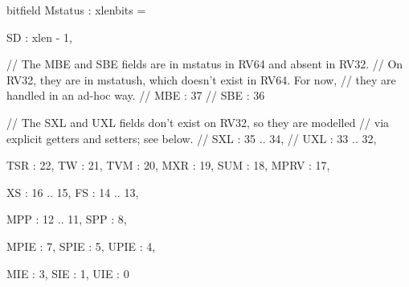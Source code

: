 bitfield Mstatus : xlenbits = {
  SD   : xlen - 1,

  // The MBE and SBE fields are in mstatus in RV64 and absent in RV32.
  // On RV32, they are in mstatush, which doesn't exist in RV64.  For now,
  // they are handled in an ad-hoc way.
  // MBE  : 37
  // SBE  : 36

  // The SXL and UXL fields don't exist on RV32, so they are modelled
  // via explicit getters and setters; see below.
  // SXL  : 35 .. 34,
  // UXL  : 33 .. 32,

  TSR  : 22,
  TW   : 21,
  TVM  : 20,
  MXR  : 19,
  SUM  : 18,
  MPRV : 17,

  XS   : 16 .. 15,
  FS   : 14 .. 13,

  MPP  : 12 .. 11,
  SPP  : 8,

  MPIE : 7,
  SPIE : 5,
  UPIE : 4,

  MIE  : 3,
  SIE  : 1,
  UIE  : 0
}

